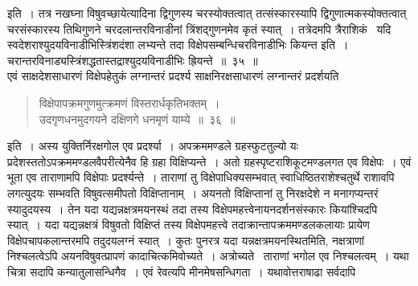 \documentclass[11pt, openany]{book}
\begin{document}
\newpage

\noindent इति~। तत्र {\qt नखघ्ना विषुवच्छाये}त्यादिना द्विगुणस्य चरस्योक्तत्वात् तत्संस्कारस्यापि द्विगुणात्मकस्योक्तत्वात् चरसंस्कारस्य तिथिगुणने चरदलान्तरविनाडीनां त्रिंशद्गुणनमेव कृतं स्यात्~। तत्रेदमपि त्रैराशिकं \textendash\ यदि स्वदेशराश्युदयविनाडीभिस्त्रिंशदंशा लभ्यन्ते तदा विक्षेपसम्बन्धिचरविनाडीभिः कियन्त इति~। चरान्तरविनाड्यस्त्रिंशद्धतास्तद्राश्युदयविनाडीभिः ह्रियन्ते~॥~३५~॥ \\

\indent एवं साक्षदेशसाधारणं विक्षेपहेतुकं लग्नान्तरं प्रदर्श्य साक्षनिरक्षसाधारणं लग्नान्तरं प्रदर्शयति\textendash  
\begin{quote}
{\ab विक्षेपापक्रमगुणमुत्क्रमणं विस्तरार्धकृतिभक्तम्~। \\
 उदगृणधनमुदगयने दक्षिणगे धनमृणं याम्ये~॥~३६~॥} 
\end{quote}

\noindent इति~। अस्य युक्तिर्निरक्षगोल एव प्रदर्श्या~। अपक्रममण्डले ग्रहस्फुटतुल्यो यः प्रदेशस्ततोऽपक्रममण्डलवैपरीत्येनैव हि ग्रहा
विक्षिप्यन्ते~। अतो ग्रहस्पृष्टराशिकूटमण्डलगत एव विक्षेपः~। एवं भूता एव ताराणामपि विक्षेपाः प्रदर्श्यन्ते~। ताराणां तु विक्षेपाधिक्यसम्भवात्
स्वाधिष्ठितराशेश्चतुर्थे राशावपि लगत्युदयः सम्भवति विषुवत्समीपतो विक्षिप्तानाम्~। अयनतो विक्षिप्तानां तु निरक्षदेशे न मनागप्यन्तरं स्यादुदयस्य~। तेन यदा यद्यन्नक्षत्रमयनस्थं तदा तस्य विक्षेपमहत्त्वेनायनदर्शनसंस्कारः कियांश्चिदपि स्यात्~। यदा यद्यन्नक्षत्रं विषुवतो विक्षिप्तं तस्य
विक्षेपमहत्त्वे तदाक्रान्तापक्रममण्डलकलायाः प्रायेण विक्षेपचापकलान्तरमपि तदुदयलग्नं स्यात्~। कुतः पुनरत्र यदा यन्नक्षत्रमयनस्थितमिति, नक्षत्राणां निश्चलत्वेऽपि अयनविषुवत्प्रापणं कादाचित्कमिवोच्यते~। अत्रोच्यते \textendash\ ताराणां भगोल एव निश्चलत्वम्~। यथा चित्रा सदापि कन्यातुलासन्धिगैव~। एवं रेवत्यपि मीनमेषसन्धिगता~। यथावोत्तराषाढा सर्वदापि

\newpage
\end{document}
